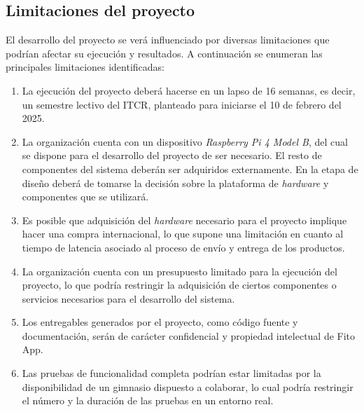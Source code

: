 \subsection{Limitaciones del proyecto}
El desarrollo del proyecto se verá influenciado por diversas limitaciones que podrían afectar su ejecución y resultados. A continuación se enumeran las principales limitaciones identificadas:

\begin{enumerate}
    \item La ejecución del proyecto deberá hacerse en un lapso de 16 semanas, es decir, un semestre lectivo del ITCR, planteado para iniciarse el 10 de febrero del 2025.
    \item La organización cuenta con un dispositivo \textit{Raspberry Pi 4 Model B}, del cual se dispone para el desarrollo del proyecto de ser necesario. El resto de componentes del sistema deberán ser adquiridos externamente. En la etapa de diseño deberá de tomarse la decisión sobre la plataforma de \textit{hardware} y componentes que se utilizará.
    \item Es posible que adquisición del \textit{hardware} necesario para el proyecto implique hacer una compra internacional, lo que supone una limitación en cuanto al tiempo de latencia asociado al proceso de envío y entrega de los productos.
    \item La organización cuenta con un presupuesto limitado para la ejecución del proyecto, lo que podría restringir la adquisición de ciertos componentes o servicios necesarios para el desarrollo del sistema.
    \item Los entregables generados por el proyecto, como código fuente y documentación, serán de carácter confidencial y propiedad intelectual de Fito App.
    \item Las pruebas de funcionalidad completa podrían estar limitadas por la disponibilidad de un gimnasio dispuesto a colaborar, lo cual podría restringir el número y la duración de las pruebas en un entorno real.
\end{enumerate}



